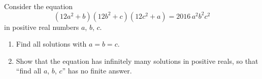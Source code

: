 Consider the equation
\[
(12a^2+b)(12b^2+c)(12c^2+a)=2016\,a^2b^2c^2
\]
in positive real numbers $a$, $b$, $c$.
\begin{enumerate}
\item[(a)] Find all solutions with $a=b=c$.
\item[(b)] Show that the equation has infinitely many solutions in positive reals, so that ``find all $a$, $b$, $c$'' has no finite answer.
\end{enumerate}
